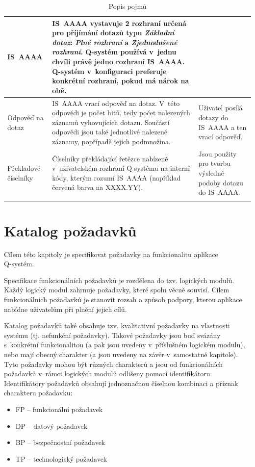 \documentclass[thesis=M,czech]{FITthesis}[2019/12/23]
\begin{document}
\begin{longtable}{|p{}|p{}|p{}|}
		IS~AAAA & IS~AAAA vystavuje 2 rozhraní určená pro příjímání dotazů typu \textit{Základní dotaz}: \textit{Plné rozhraní} a \textit{Zjednodušené rozhraní}. Q-systém používá v~jednu chvíli právě jedno rozhraní IS~AAAA. Q-systém v~konfiguraci preferuje konkrétní rozhraní, pokud má nárok na obě. & \\ \hline
		Odpověď na dotaz & IS~AAAA vrací odpověď na dotaz. V~této odpovědi je počet hitů, tedy počet nalezených záznamů vyhovujících dotazu. Součástí odpovědi jsou také jednotlivé nalezené záznamy, popřípadě jejich podmnožina. & Uživatel posílá dotazy do IS~AAAA a ten vrací odpověď. \\ \hline		
		Překladové číselníky & Číselníky překládající řetězce nabízené v~uživatelském rozhraní Q-systému na interní kódy, kterým rozumí IS~AAAA (například červená barva na XXXX.YY). & Jsou použity pro tvorbu výsledné podoby dotazu do IS~AAAA. \\ \hline
\caption{Popis pojmů}
\label{tab:Popis pojmů}
\end{longtable}

\newpage
\section{Katalog požadavků}
Cílem této kapitoly je specifikovat požadavky na funkcionalitu aplikace \\Q-systém.

Specifikace funkcionálních požadavků je rozdělena do tzv. logických modulů. Každý logický modul zahrnuje požadavky, které spolu věcně souvisí. Cílem funkcionálních požadavků je stanovit rozsah a způsob podpory, kterou aplikace nabídne uživatelům při plnění jejich cílů.

Katalog požadavků také obsahuje tzv. kvalitativní požadavky na vlastnosti systému (tj. nefunkční požadavky). Takové požadavky jsou buď svázány s~konkrétní funkcionalitou (a pak jsou uvedeny v~příslušném logickém modulu), nebo mají obecný charakter (a jsou uvedeny na závěr v~samostatné kapitole). Tyto požadavky mohou být různých charakterů a jsou od funkcionálních požadavků v~rámci logických modulů odlišeny pomocí identifikátoru. Identifikátory požadavků obsahují jednoznačnou číselnou kombinaci a příznak charakteru požadavku:
\begin{itemize}
	\item FP – funkcionální požadavek
	\item DP – datový požadavek
	\item BP – bezpečnostní požadavek
	\item TP – technologický požadavek
\end{itemize}
\end{document}
